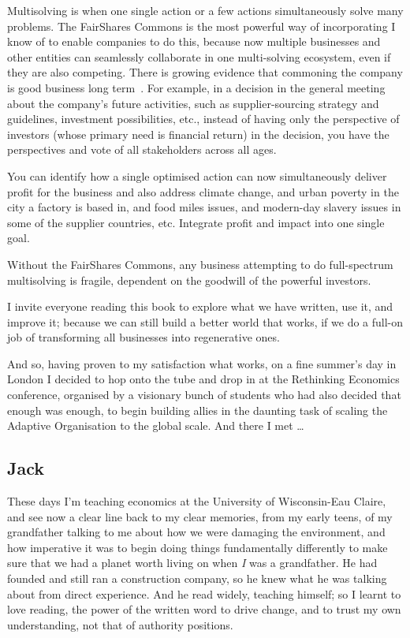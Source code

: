 Multisolving is when one single action or a few actions simultaneously solve many problems. The FairShares Commons is the most powerful way of incorporating I know of to enable companies to do this, because now multiple businesses and other entities can seamlessly collaborate in one multi-solving ecosystem, even if they are also competing. There is growing evidence that commoning the company is good business long term~\cite{lawrence-commoning-the-company, deakin-corporation-as-commons}. For example, in a decision in the general meeting about the company’s future activities, such as supplier-sourcing strategy and guidelines, investment possibilities, etc., instead of having only the perspective of investors (whose primary need is financial return) in the decision, you have the perspectives and vote of all stakeholders across all ages. 


You can identify how a single optimised action can now simultaneously deliver profit for the business and also address climate change, and urban poverty in the city a factory is based in, and food miles issues, and modern-day slavery issues in some of the supplier countries, etc. Integrate profit and impact into one single goal. 


Without the FairShares Commons, any business attempting to do full-spectrum multisolving is fragile, dependent on the goodwill of the powerful investors.


I invite everyone reading this book to explore what we have written, use it, and improve it; because we can still build a better world that works, if we do a full-on job of transforming all businesses into regenerative ones. 


And so, having proven to my satisfaction what works, on a fine summer's day in London I decided to hop onto the tube and drop in at the Rethinking Economics conference, organised by a visionary bunch of students who had also decided that enough was enough, to begin building allies in the daunting task of scaling the Adaptive Organisation to the global scale. And there I met \ldots




\subsection*{Jack}
These days I’m teaching economics at the University of Wisconsin-Eau Claire, and see now a clear line back to my clear memories, from my early teens, of my grandfather talking to me about how we were damaging the environment, and how imperative it was to begin doing things fundamentally differently to make sure that we had a planet worth living on when \emph{I} was a grandfather. He had founded and still ran a construction company, so he knew what he was talking about from direct experience. And he read widely, teaching himself; so I learnt to love reading, the power of the written word to drive change, and to trust my own understanding, not that of authority positions.


